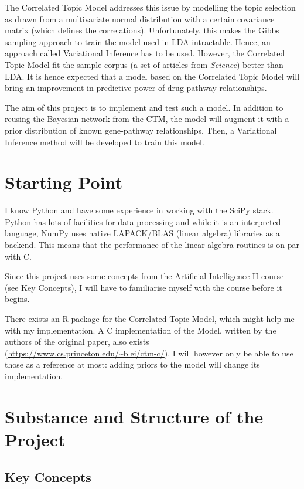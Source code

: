 \documentclass[12pt,a4]{article}
\begin{document}
The Correlated Topic Model\cite{2007} addresses this issue by modelling the topic selection as drawn from a multivariate normal distribution with a certain covariance matrix (which defines the correlations). Unfortunately, this makes the Gibbs sampling approach to train the model used in LDA intractable. Hence, an approach called Variational Inference has to be used. However, the Correlated Topic Model fit the sample corpus (a set of articles from {\em Science}) better than LDA. It is hence expected that a model based on the Correlated Topic Model will bring an improvement in predictive power of drug-pathway relationships.

The aim of this project is to implement and test such a model. In addition to reusing the Bayesian network from the CTM, the model will augment it with a prior distribution of known gene-pathway relationships. Then, a Variational Inference method will be developed to train this model.

\section*{Starting Point}

I know Python and have some experience in working with the SciPy stack. Python has lots of facilities for data processing and while it is an interpreted language, NumPy uses native LAPACK/BLAS (linear algebra) libraries as a backend. This means that the performance of the linear algebra routines is on par with C.

Since this project uses some concepts from the Artificial Intelligence II course (see Key Concepts), I will have to familiarise myself with the course before it begins.

There exists an R package for the Correlated Topic Model, which might help me with my implementation. A C implementation of the Model, written by the authors of the original paper, also exists (\url{https://www.cs.princeton.edu/~blei/ctm-c/}). I will however only be able to use those as a reference at most: adding priors to the model will change its implementation.

\section*{Substance and Structure of the Project}

\subsection*{Key Concepts}
\end{document}
